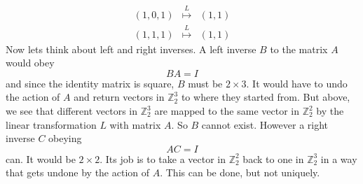 {\[\begin{array}{ccc}
(1,0,1)&\stackrel{L}\mapsto&(1,1)\\
(1,1,1)&\stackrel{L}\mapsto&(1,1)
\end{array}
\]
Now lets think about left and right inverses. A left inverse $B$ to the matrix $A$
would obey
\[
BA=I
\]
and since the identity matrix is square, $B$ must be $2\times3$. It would have to undo the action of $A$ and return vectors in ${\mathbb Z}_2^3$
to where they started from. But above, we see that different vectors in ${\mathbb Z}_2^3$ are mapped to the same vector in ${\mathbb Z}_2^2$
by the linear transformation $L$ with matrix $A$. So $B$ cannot exist. However a right inverse $C$ obeying
\[
AC=I
\]
can. It would be $2\times2$. Its job is to take a vector in ${\mathbb Z}_2^2$ back to one in ${\mathbb Z}_2^3$ in a way that gets undone by the action of $A$.
This can be done, but not uniquely. 

} %

